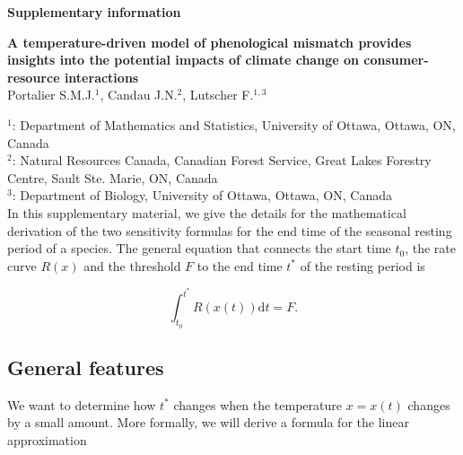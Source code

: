 \documentclass[12 pt]{article}
\begin{document}
\begin{Large}
\begin{center}
\textbf{Supplementary information}
\end{center}
\end{Large}
\begin{large}
\textbf{A temperature-driven model of phenological mismatch provides insights into the potential impacts of climate change on consumer-resource interactions} \\
\vspace{1 cm}
Portalier S.M.J.$^{1}$, Candau J.N.$^2$, Lutscher F.$^{1,3}$ \\
\end{large}
$^1$: Department of Mathematics and Statistics, University of Ottawa, Ottawa, ON, Canada \\
$^2$: Natural Resources Canada, Canadian Forest Service, Great Lakes Forestry Centre, Sault Ste. Marie, ON, Canada\\
$^3$: Department of Biology, University of Ottawa, Ottawa, ON, Canada \\
 
\vspace{1 cm}
In this supplementary material, we give the details for the mathematical derivation of the two sensitivity formulas for the end time of the seasonal resting period of a species. The general equation that connects the start time $t_0$, the rate curve $R(x)$ and the threshold $F$ to the end time $t^*$ of the resting period is

\begin{equation}
    \int _{t_0} ^{t^*} R(x(t)) \mathrm{d}t = F. \tag*{Eq. S\theequation}
\end{equation}

\subsection*{General features}
We want to determine how $t^*$ changes when the temperature $x = x(t)$ changes by a small amount. More formally, we will derive a formula for the linear approximation
\end{document}
